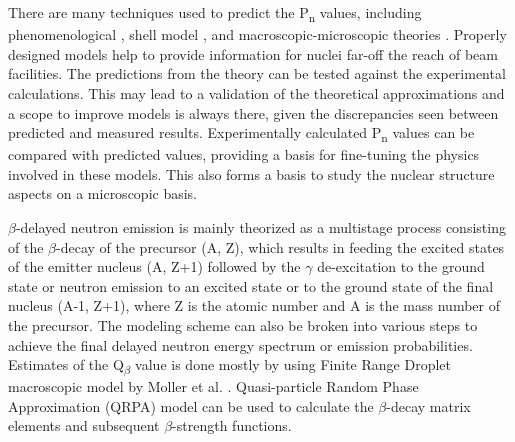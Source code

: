 There are many techniques used to predict the P\textsubscript{n} values, including phenomenological \citep{Phenomenoliogical}, shell model \citep{shellmodelhalflives}, and macroscopic-microscopic theories \citep{pmollermacroscopic}. Properly designed models help to provide information for nuclei far-off the reach of beam facilities. The predictions from the theory can be tested against the experimental calculations. This may lead to a validation of the theoretical approximations and a scope to improve models is always there, given the discrepancies seen between predicted and measured results. Experimentally calculated P\textsubscript{n} values can be compared with predicted values, providing a basis for fine-tuning the physics involved in these models. This also forms a basis to study the nuclear structure aspects on a microscopic basis. 

$\beta$-delayed neutron emission is mainly theorized as a multistage process consisting of the $\beta$-decay of the precursor (A, Z), which results in feeding the excited states of the emitter nucleus (A, Z+1) followed by the $\gamma$ de-excitation to the ground state or neutron emission to an excited state or to the ground state of the final nucleus (A-1, Z+1), where Z is the atomic number and A is the mass number of the precursor. The modeling scheme can also be broken into various steps to achieve the final delayed neutron energy spectrum or emission probabilities. Estimates of the Q\textsubscript{$\beta$} value is done mostly by using Finite Range Droplet macroscopic model by Moller et al. \citep{FRDMmoller}. Quasi-particle Random Phase Approximation (QRPA) model can be used to calculate the $\beta$-decay matrix elements and subsequent $\beta$-strength functions.  


